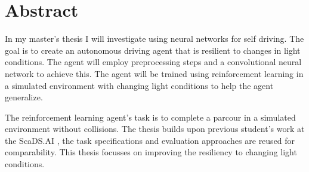 \section*{Abstract}
\label{sec:Abstract}

In my master's thesis I will investigate using neural networks for self driving. The goal is to create an autonomous driving agent that is resilient to changes in light conditions. The agent will employ preprocessing steps and a convolutional neural network to achieve this. The agent will be trained using reinforcement learning in a simulated environment with changing light conditions to help the agent generalize.

The reinforcement learning agent's task is to complete a parcour in a simulated environment without collisions. The thesis builds upon previous student's work at the ScaDS.AI \autocite{maximilian}, the task specifications and evaluation approaches are reused for comparability. This thesis focusses on improving the resiliency to changing light conditions.

